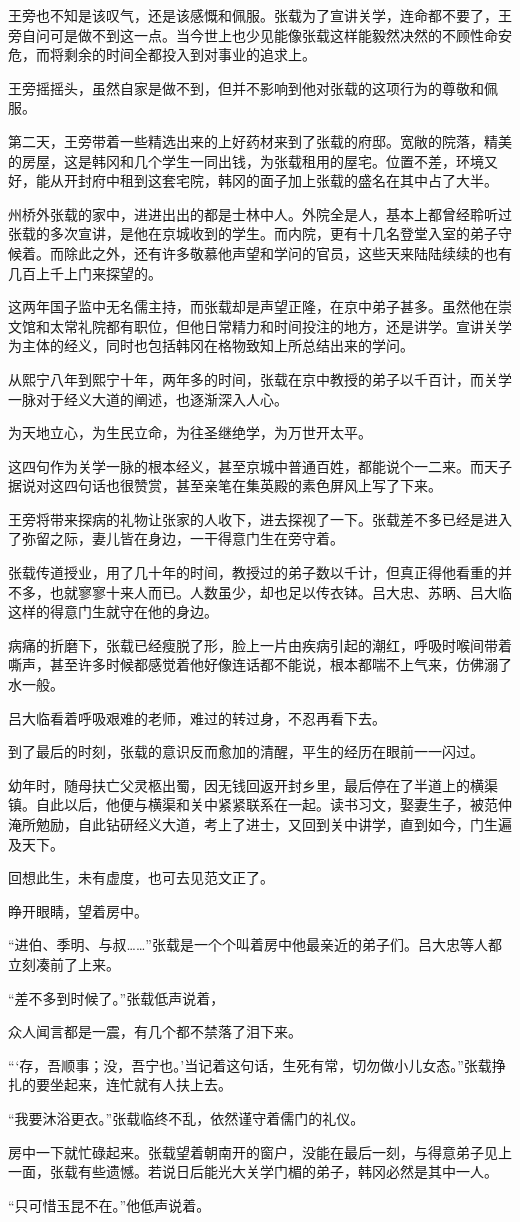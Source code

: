 王旁也不知是该叹气，还是该感慨和佩服。张载为了宣讲关学，连命都不要了，王旁自问可是做不到这一点。当今世上也少见能像张载这样能毅然决然的不顾性命安危，而将剩余的时间全都投入到对事业的追求上。

王旁摇摇头，虽然自家是做不到，但并不影响到他对张载的这项行为的尊敬和佩服。

第二天，王旁带着一些精选出来的上好药材来到了张载的府邸。宽敞的院落，精美的房屋，这是韩冈和几个学生一同出钱，为张载租用的屋宅。位置不差，环境又好，能从开封府中租到这套宅院，韩冈的面子加上张载的盛名在其中占了大半。

州桥外张载的家中，进进出出的都是士林中人。外院全是人，基本上都曾经聆听过张载的多次宣讲，是他在京城收到的学生。而内院，更有十几名登堂入室的弟子守候着。而除此之外，还有许多敬慕他声望和学问的官员，这些天来陆陆续续的也有几百上千上门来探望的。

这两年国子监中无名儒主持，而张载却是声望正隆，在京中弟子甚多。虽然他在崇文馆和太常礼院都有职位，但他日常精力和时间投注的地方，还是讲学。宣讲关学为主体的经义，同时也包括韩冈在格物致知上所总结出来的学问。

从熙宁八年到熙宁十年，两年多的时间，张载在京中教授的弟子以千百计，而关学一脉对于经义大道的阐述，也逐渐深入人心。

为天地立心，为生民立命，为往圣继绝学，为万世开太平。

这四句作为关学一脉的根本经义，甚至京城中普通百姓，都能说个一二来。而天子据说对这四句话也很赞赏，甚至亲笔在集英殿的素色屏风上写了下来。

王旁将带来探病的礼物让张家的人收下，进去探视了一下。张载差不多已经是进入了弥留之际，妻儿皆在身边，一干得意门生在旁守着。

张载传道授业，用了几十年的时间，教授过的弟子数以千计，但真正得他看重的并不多，也就寥寥十来人而已。人数虽少，却也足以传衣钵。吕大忠、苏昞、吕大临这样的得意门生就守在他的身边。

病痛的折磨下，张载已经瘦脱了形，脸上一片由疾病引起的潮红，呼吸时喉间带着嘶声，甚至许多时候都感觉着他好像连话都不能说，根本都喘不上气来，仿佛溺了水一般。

吕大临看着呼吸艰难的老师，难过的转过身，不忍再看下去。

到了最后的时刻，张载的意识反而愈加的清醒，平生的经历在眼前一一闪过。

幼年时，随母扶亡父灵柩出蜀，因无钱回返开封乡里，最后停在了半道上的横渠镇。自此以后，他便与横渠和关中紧紧联系在一起。读书习文，娶妻生子，被范仲淹所勉励，自此钻研经义大道，考上了进士，又回到关中讲学，直到如今，门生遍及天下。

回想此生，未有虚度，也可去见范文正了。

睁开眼睛，望着房中。

“进伯、季明、与叔……”张载是一个个叫着房中他最亲近的弟子们。吕大忠等人都立刻凑前了上来。

“差不多到时候了。”张载低声说着，

众人闻言都是一震，有几个都不禁落了泪下来。

“‘存，吾顺事；没，吾宁也。’当记着这句话，生死有常，切勿做小儿女态。”张载挣扎的要坐起来，连忙就有人扶上去。

“我要沐浴更衣。”张载临终不乱，依然谨守着儒门的礼仪。

房中一下就忙碌起来。张载望着朝南开的窗户，没能在最后一刻，与得意弟子见上一面，张载有些遗憾。若说日后能光大关学门楣的弟子，韩冈必然是其中一人。

“只可惜玉昆不在。”他低声说着。


